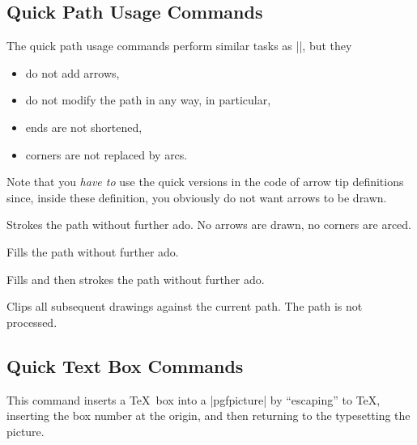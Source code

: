 \subsection{Quick Path Usage Commands}

The quick path usage commands perform similar tasks as |\pgfusepath|,
but they
\begin{itemize}
\item
  do not add arrows,
\item
  do not modify the path in any way, in particular,
\item
  ends are not shortened,
\item
  corners are not replaced by arcs.
\end{itemize}

Note that you \emph{have to} use the quick versions in the code of
arrow tip definitions since, inside these definition, you obviously do
not want arrows to be drawn.

\begin{command}{\pgfusepathqstroke}
  Strokes the path without further ado. No arrows are drawn, no
  corners are arced.

\begin{codeexample}[]
\begin{pgfpicture}
  \pgfpathqcircle{5pt}
  \pgfusepathqstroke
\end{pgfpicture}
\end{codeexample}
\end{command}

\begin{command}{\pgfusepathqfill}
  Fills the path without further ado.
\end{command}

\begin{command}{\pgfusepathqfillstroke}
  Fills and then strokes the path without further ado.
\end{command}

\begin{command}{\pgfusepathqclip}
  Clips all subsequent drawings against the current path. The path is
  not processed.
\end{command}


\subsection{Quick Text Box Commands}

\begin{command}{\pgfqbox{}}
  This command inserts a \TeX\ box into a |{pgfpicture}| by
  ``escaping'' to \TeX, inserting the box number  at
  the origin, and then returning to the typesetting the picture.
\end{command}

